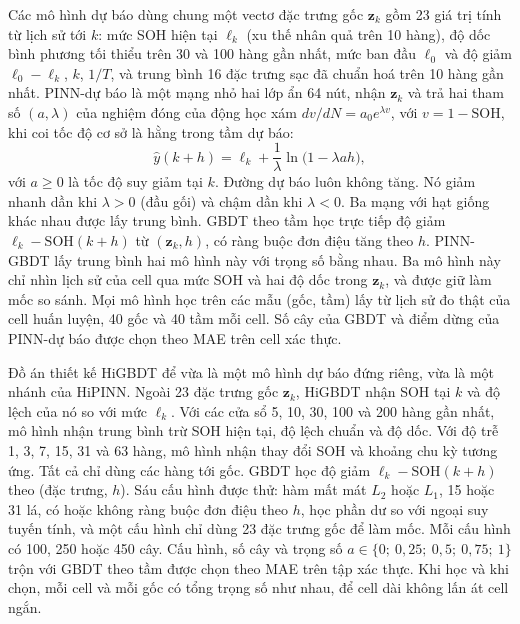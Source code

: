 



Các mô hình dự báo dùng chung một vectơ đặc trưng gốc $\mathbf{z}_k$ gồm 23 giá trị tính từ lịch sử tới $k$: mức SOH hiện
tại $\ell_k$ (xu thế nhân quả trên 10 hàng), độ dốc bình phương tối thiểu trên 30 và 100 hàng gần nhất, mức ban đầu
$\ell_0$ và độ giảm $\ell_0 - \ell_k$, $k$, $1/T$, và trung bình 16 đặc trưng sạc đã chuẩn hoá trên 10 hàng gần nhất.
PINN-dự báo là một mạng nhỏ hai lớp ẩn 64 nút, nhận $\mathbf{z}_k$ và trả hai tham số $(a, \lambda)$ của nghiệm đóng của
động học xám $dv/dN = a_0 e^{\lambda v}$, với $v = 1 - \text{SOH}$, khi coi tốc độ cơ sở là hằng trong tầm dự báo:
\begin{equation}\label{eq:fcdrop}
\hat y(k+h) = \ell_k + \frac{1}{\lambda}\ln\bigl(1 - \lambda a h\bigr),
\end{equation}
với $a \geq 0$ là tốc độ suy giảm tại $k$. Đường dự báo luôn không tăng. Nó giảm nhanh dần khi $\lambda > 0$ (đầu gối) và
chậm dần khi $\lambda < 0$. Ba mạng với hạt giống khác nhau được lấy trung bình. GBDT theo tầm học trực tiếp độ giảm
$\ell_k - \text{SOH}(k+h)$ từ $(\mathbf{z}_k, h)$, có ràng buộc đơn điệu tăng theo $h$. PINN-GBDT lấy trung bình hai mô
hình này với trọng số bằng nhau. Ba mô hình này chỉ nhìn lịch sử của cell qua mức SOH và hai độ dốc trong $\mathbf{z}_k$,
và được giữ làm mốc so sánh. Mọi mô hình học trên các mẫu (gốc, tầm) lấy từ lịch sử đo thật của cell huấn luyện, 40 gốc
và 40 tầm mỗi cell. Số cây của GBDT và điểm dừng của PINN-dự báo được chọn theo MAE trên cell xác thực.

Đồ án thiết kế HiGBDT để vừa là một mô hình dự báo đứng riêng, vừa là một nhánh của HiPINN. Ngoài 23 đặc trưng gốc
$\mathbf{z}_k$, HiGBDT nhận SOH tại $k$ và độ lệch của nó so với mức $\ell_k$. Với các cửa sổ 5, 10, 30, 100 và 200 hàng
gần nhất, mô hình nhận trung bình trừ SOH hiện tại, độ lệch chuẩn và độ dốc. Với độ trễ 1, 3, 7, 15, 31 và 63 hàng, mô
hình nhận thay đổi SOH và khoảng chu kỳ tương ứng. Tất cả chỉ dùng các hàng tới gốc. GBDT học độ giảm $\ell_k -
\text{SOH}(k+h)$ theo (đặc trưng, $h$). Sáu cấu hình được thử: hàm mất mát $L_2$ hoặc $L_1$, 15 hoặc 31 lá, có hoặc không
ràng buộc đơn điệu theo $h$, học phần dư so với ngoại suy tuyến tính, và một cấu hình chỉ dùng 23 đặc trưng gốc để làm mốc.
Mỗi cấu hình có 100, 250 hoặc 450 cây. Cấu hình, số cây và trọng số $a \in \{0;\ 0{,}25;\ 0{,}5;\ 0{,}75;\ 1\}$ trộn với
GBDT theo tầm được chọn theo MAE trên tập xác thực. Khi học và khi chọn, mỗi cell và mỗi gốc có tổng trọng số như nhau,
để cell dài không lấn át cell ngắn.

